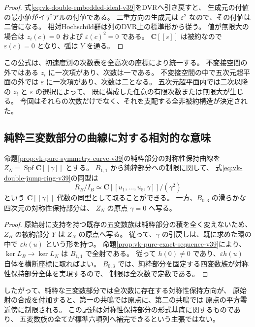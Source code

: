 \begin{proof}
式\eqref{eq:vk-double-embedded-ideal-v39}をDVRへ引き戻すと、
生成元の付値の最小値がイデアルの付値である。
二重方向の生成元は $\varepsilon^2$ なので、その付値は二倍になる。
相対Hochschild群は列のDVR上の標準形から従う。
値が無限大の場合は $z_i(c)=0$ および $\varepsilon(c)^2=0$ である。
$\mathbf C[[s]]$ は被約なので $\varepsilon(c)=0$ となり、弧は $Y$ を通る。
\end{proof}

この公式は、初速度別の次数表を全高次の座標により統一する。
不変接空間の外ではある $z_i$ に一次項があり、次数は一である。
不変接空間の中で五次元超平面の外では $\varepsilon$ に一次項があり、次数は二となる。
五次元超平面内では二次以降の $z_i$ と $\varepsilon$ の選択によって、
既に構成した任意の有限次数または無限大が生じる。
今回はそれらの次数だけでなく、それを支配する全非被約構造が決定された。

\subsection{純粋三変数部分の曲線に対する相対的な意味}

\begin{corollary}[純粋対称性保持曲線の一次近傍]
\label{cor:vk-double-over-pure-curve-v39}
命題\ref{prop:vk-pure-symmetry-curve-v39}の純粋部分の対称性保持曲線を
$Z_N=\operatorname{Spf}\mathbf C[[\gamma]]$ とする。
$B_{1,1}$ から純粋部分への制限に関して、
式\eqref{eq:vk-double-jump-ring-v39}の同型は
\[
 R_B/I_B\simeq
 \mathbf C[[u_1,\ldots,u_5,\gamma]]/(\gamma^2)
\]
という $\mathbf C[[\gamma]]$ 代数の同型として取ることができる。
一方、$B_{0,3}$ の滑らかな四次元の対称性保持部分は、
$Z_N$ の原点 $\gamma=0$ へ写る。
\end{corollary}

\begin{proof}
原始射に支持を持つ既存の五変数族は純粋部分の積を全く変えないため、
$Z_B$ の被約部分 $Y$ は $Z_N$ の原点へ写る。
従って、$\gamma$ の引戻しは、既に求めた環の中で
$\varepsilon h(u)$ という形を持つ。
命題\ref{prop:vk-pure-exact-sequence-v39}により、
$\ker L_B\to\ker L_N$ は $B_{1,1}$ で全射である。
従って $h(0)\ne0$ であり、$\varepsilon h(u)$ 自体を横断座標に取ればよい。
$B_{0,3}$ では、純粋部分を固定する四変数族が対称性保持部分全体を実現するので、
制限は全次数で定数である。
\end{proof}

したがって、純粋な三変数部分では全次数に存在する対称性保持方向が、
原始射の合成を付加すると、第一の共鳴では原点に、第二の共鳴では
原点の平方零近傍に制限される。
この記述は対称性保持部分の形式基底に関するものであり、
五変数族の全てが標準六項列へ補完できるという主張ではない。

